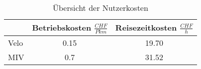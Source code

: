 %
%
%
%

\begin{table}[h!]
\flushleft
\renewcommand{\arraystretch}{1.4}

\begin{tabular}{ @{} l|c|c @{} }
            & Betriebskosten   $\frac{CHF}{Pkm}$ & Reisezeitkosten   $\frac{CHF}{h}$	         \\ \hline
Velo	    &        0.15       			     & 	    19.70            \\
MIV         &        0.7                         &      31.52   
\end{tabular}
\caption{Übersicht der Nutzerkosten}
\label{tab:t-04-03-02-Nutzerkosten}
\end{table}

%
%





%


